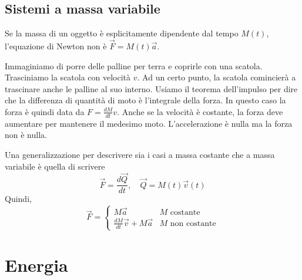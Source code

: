 \documentclass[a4paper]{article}
\begin{document}
%

\subsection{Sistemi a massa variabile}

Se la massa di un oggetto è esplicitamente dipendente dal tempo \(M(t)\),
l'equazione di Newton non è \(\vec{F} = M(t) \vec{a}\).

Immaginiamo di porre delle palline per terra e coprirle con una scatola.
Trasciniamo la scatola con velocità \(v\). Ad un certo punto, la scatola comincierà a trascinare
anche le palline al suo interno.
Usiamo il teorema dell'impulso per dire che la differenza di quantità di moto è l'integrale
della forza.
In questo caso la forza è quindi data da \(F = \frac{dM}{dt} v\). Anche se la velocità è costante,
la forza deve aumentare per mantenere il medesimo moto.
L'accelerazione è nulla ma la forza non è nulla.

Una generalizzazione per descrivere sia i casi a massa costante che a massa variabile
è quella di scrivere
\[
    \vec{F} = \frac{d\vec{Q}}{dt}, \quad \vec{Q} = M(t)\vec{v}(t)
\]
Quindi,
\[
    \vec{F} = \begin{cases}
        M \vec{a} & M \text{ costante}\\
        \frac{dM}{dt}\vec{v} + M\vec{a} & M \text{ non costante}
    \end{cases}
\]


\pagebreak

\section{Energia}

%
%
\end{document}
